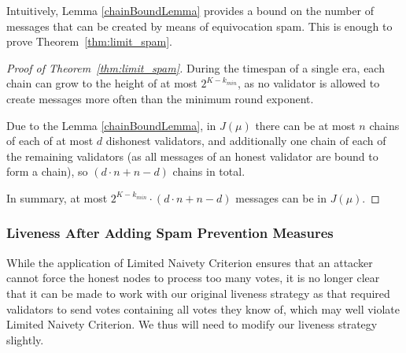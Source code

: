 \documentclass[12pt, fleqn]{article}
\begin{document}
Intuitively, Lemma \ref{chainBoundLemma} provides a bound on the number of messages that can be created by means of equivocation spam. This is enough to prove Theorem~\ref{thm:limit_spam}.




\begin{proof}[Proof of Theorem~\ref{thm:limit_spam}]
During the timespan of a single era, each chain can grow to the height of at most $2^{K-k_{min}}$, as no validator is allowed to create messages more often than the minimum round exponent.

Due to the Lemma \ref{chainBoundLemma}, in $J(\mu)$ there can be at most $n$ chains of each of at most $d$ dishonest validators, and additionally one chain of each of the remaining validators (as all messages of an honest validator are bound to form a chain), so $(d\cdot n + n-d)$ chains in total.

In summary, at most $2^{K-k_{min}}\cdot (d\cdot n + n-d)$ messages can be in $J(\mu)$. 

\end{proof}

\subsubsection{Liveness After Adding Spam Prevention Measures}

While the application of Limited Naivety Criterion ensures that an attacker cannot force the honest nodes to process too many votes, it is no longer clear that it can be made to work with our original liveness strategy as that required validators to send votes containing all votes they know of, which may well violate Limited Naivety Criterion. We thus will need to modify our liveness strategy slightly.
\end{document}
